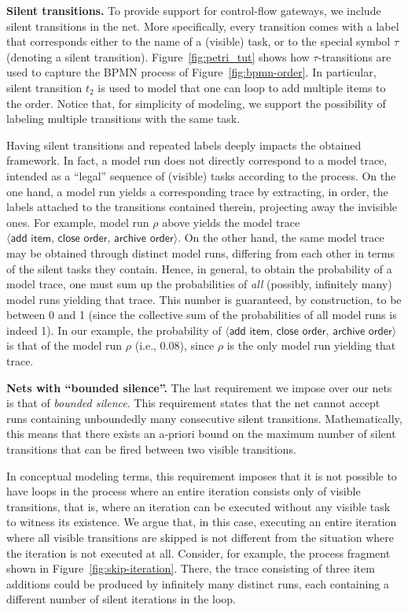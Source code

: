 \smallskip
\noindent
\textbf{Silent transitions.} To provide support for control-flow gateways, we include silent transitions in the net. More specifically, every transition comes with a label that corresponds either to the name of a (visible) task, or to the special symbol $\tau$ (denoting a silent transition). Figure~\ref{fig:petri_tut} shows how $\tau$-transitions are used to capture the BPMN process of Figure~\ref{fig:bpmn-order}. In particular, silent transition $t_2$ is used to model that one can loop to add multiple items to the order. Notice that, for simplicity of modeling, we support the possibility of labeling multiple transitions with the same task.

Having silent transitions and repeated labels deeply impacts the obtained framework. In fact, a model run does not directly correspond to a model trace, intended as a ``legal'' sequence of (visible) tasks according to the process. On the one hand, a model run yields a corresponding trace by extracting, in order, the labels attached to the transitions contained therein, projecting away the invisible ones. For example, model run $\rho$ above yields the model trace $\langle \textsf{add item},\,\textsf{close order},\,\textsf{archive order}\rangle$. On the other hand, the same model trace may be obtained through distinct model runs, differing from each other in terms of the silent tasks they contain. Hence, in general, to obtain the probability of a model trace, one must sum up the probabilities of \emph{all} (possibly, infinitely many) model runs yielding that trace. This number is guaranteed, by construction, to be between 0 and 1 (since the collective sum of the probabilities of all model runs is indeed 1). In our example, the probability of $\langle \textsf{add item},\,\textsf{close order},\,\textsf{archive order}\rangle$ is that of the model run $\rho$ (i.e., $0.08$), since $\rho$ is the only model run yielding that trace.


\smallskip
\noindent
\textbf{Nets with ``bounded silence''.} The last requirement we impose over our nets is that of \emph{bounded silence}. This requirement states that the net cannot accept runs containing unboundedly many consecutive silent transitions. Mathematically, this means that there exists an a-priori bound on the maximum number of silent transitions that can be fired between two visible transitions.

In conceptual modeling terms, this requirement imposes that it is not possible to have loops in the process where an entire iteration consists only of visible transitions, that is, where an iteration can be executed without any visible task to witness its existence. We argue that, in this case, executing an entire iteration where all visible transitions are skipped is not different from the situation where the iteration is not executed at all. Consider, for example, the process fragment shown in Figure~\ref{fig:skip-iteration}. There, the trace consisting of three item additions could be produced by infinitely many distinct runs, each containing a different number of silent iterations in the loop.

